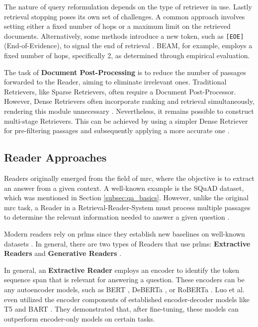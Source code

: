 The nature of query reformulation depends on the type of retriever in use. Lastly retrieval stopping poses its own set of challenges. A common approach involves setting either a fixed number of hops or a maximum limit on the retrieved documents. Alternatively, some methods introduce a new token, such as \verb|[EOE]| (End-of-Evidence), to signal the end of retrieval \cite{zhu_retrieving_2021}. BEAM, for example, employs a fixed number of hops, specifically 2, as determined through empirical evaluation.

The task of \textbf{Document Post-Processing} is to reduce the number of passages forwarded to the Reader, aiming to eliminate irrelevant ones. Traditional Retrievers, like Sparse Retrievers, often require a Document Post-Processor. However, Dense Retrievers often incorporate ranking and retrieval simultaneously, rendering this module unnecessary \cite{zhu_retrieving_2021}. Nevertheless, it remains possible to construct multi-stage Retrievers. This can be achieved by using a simpler Dense Retriever for pre-filtering passages and subsequently applying a more accurate one \cite{liu_dense_2021}.


\subsection{Reader Approaches}
\label{subsec:qa_reader}

Readers originally emerged from the field of \gls{mrc}, where the objective is to extract an answer from a given context. A well-known example is the SQuAD \cite{rajpurkar_squad_2016} dataset, which was mentioned in Section \ref{subsec:qa_basics}. However, unlike the original \gls{mrc} task, a Reader in a Retrieval-Reader-System must process multiple passages to determine the relevant information needed to answer a given question \cite{zhu_retrieving_2021}. 

Modern readers rely on \gls{prlm}s since they establish new baselines on well-known datasets \cite{luo_choose_2022}. In general, there are two types of Readers that use \gls{prlm}s: \textbf{Extractive Readers} and \textbf{Generative Readers} \cite{jurafsky_speech_2023,zhu_retrieving_2021,luo_choose_2022}.

In general, an \textbf{Extractive Reader} employs an encoder to identify the token sequence span that is relevant for answering a question. These encoders can be any autoencoder models, such as BERT \cite{devlin_bert_2019}, DeBERTa \cite{he_deberta_2020}, or RoBERTa \cite{liu_roberta_2019}. Luo et al. \cite{luo_choose_2022} even utilized the encoder components of established encoder-decoder models like T5 \cite{raffel_exploring_2023} and BART \cite{lewis_bart_2019}. They demonstrated that, after fine-tuning, these models can outperform encoder-only models on certain tasks.

